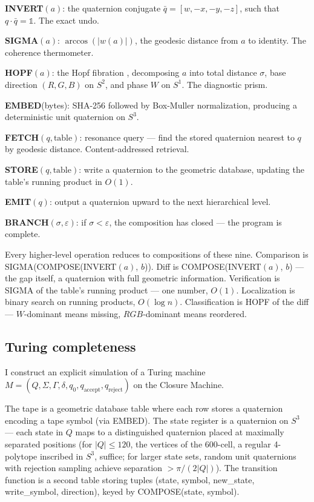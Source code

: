\documentclass[12pt,a4paper]{article}
\begin{document}
\textbf{INVERT}$(a)$: the quaternion conjugate $\bar{q} = [w, -x, -y, -z]$, such that $q \cdot \bar{q} = \mathbb{1}$. The exact undo.

\textbf{SIGMA}$(a)$: $\arccos(|w(a)|)$, the geodesic distance from $a$ to identity. The coherence thermometer.

\textbf{HOPF}$(a)$: the Hopf fibration \cite{hopf1931}, decomposing $a$ into total distance $\sigma$, base direction $(R, G, B)$ on $S^2$, and phase $W$ on $S^1$. The diagnostic prism.

\textbf{EMBED}(bytes): SHA-256 followed by Box-Muller normalization, producing a deterministic unit quaternion on $S^3$.

\textbf{FETCH}$(q, \text{table})$: resonance query --- find the stored quaternion nearest to $q$ by geodesic distance. Content-addressed retrieval.

\textbf{STORE}$(q, \text{table})$: write a quaternion to the geometric database, updating the table's running product in $O(1)$.

\textbf{EMIT}$(q)$: output a quaternion upward to the next hierarchical level.

\textbf{BRANCH}$(\sigma, \varepsilon)$: if $\sigma < \varepsilon$, the composition has closed --- the program is complete.

Every higher-level operation reduces to compositions of these nine. Comparison is SIGMA(COMPOSE(INVERT$(a)$, $b$)). Diff is COMPOSE(INVERT$(a)$, $b$) --- the gap itself, a quaternion with full geometric information. Verification is SIGMA of the table's running product --- one number, $O(1)$. Localization is binary search on running products, $O(\log n)$. Classification is HOPF of the diff --- $W$-dominant means missing, $RGB$-dominant means reordered.

\subsection{Turing completeness}

I construct an explicit simulation of a Turing machine $M = (Q, \Sigma, \Gamma, \delta, q_0, q_{\text{accept}}, q_{\text{reject}})$ on the Closure Machine.

The tape is a geometric database table where each row stores a quaternion encoding a tape symbol (via EMBED). The state register is a quaternion on $S^3$ --- each state in $Q$ maps to a distinguished quaternion placed at maximally separated positions (for $|Q| \leq 120$, the vertices of the 600-cell, a regular 4-polytope inscribed in $S^3$, suffice; for larger state sets, random unit quaternions with rejection sampling achieve separation $> \pi/(2|Q|)$). The transition function is a second table storing tuples (state, symbol, new\_state, write\_symbol, direction), keyed by COMPOSE(state, symbol).
\end{document}
